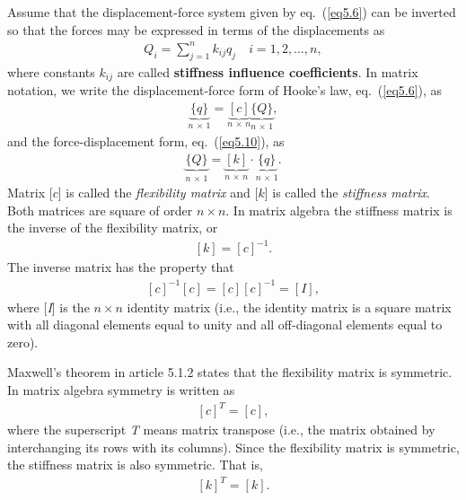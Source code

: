 \documentclass{AeroStructure-ERJohnson}
\begin{document}
Assume that the displacement-force system given by eq.~(\ref{eq5.6}) can be inverted so that the forces may be expressed in terms of the displacements as
\begin{align}\label{eq5.10}
 Q_{i}=\sum_{j=1}^{n} k_{i j} q_{j} \quad i=1,2, \ldots, n ,
\end{align}
where constants $ k_{i j} $ are called \textbf{stiffness influence coefficients}. In matrix notation, we write the displacement-force form of Hooke's law, eq.~(\ref{eq5.6}), as
\begin{align}\label{eq5.11}
 \underbrace{\{q\}}_{n\, \times\, 1}=\underbrace{[c]}_{n\, \times\, n} \underbrace{\{Q\}}_{n\, \times\, 1} ,
\end{align}
and the force-displacement form, eq.~(\ref{eq5.10}), as
\begin{align}\label{eq5.12}
\underbrace{\{Q\}}_{n\, \times\, 1}=\underbrace{[k]}_{n \,\times \,n} \cdot \underbrace{\{q\}}_{n \,\times \,1} .
\end{align}
Matrix [$c$] is called the \textit{flexibility matrix} and [$k$] is called the \textit{stiffness matrix}. Both matrices are square of order $ n \times n $. In matrix algebra the stiffness matrix is the inverse of the flexibility matrix, or
\begin{align}\label{eq5.13}
[k]=[c]^{-1} .
\end{align}
The inverse matrix has the property that
\begin{align}\label{eq5.14}
[c]^{-1}[c]=[c][c]^{-1}=[I] ,
\end{align}
where [\textit{I}] is the $ n \times n $ identity matrix (i.e., the identity matrix is a square matrix with all diagonal elements equal to unity and all off-diagonal elements equal to zero).

Maxwell's theorem in article 5.1.2 states that the flexibility matrix is symmetric. In matrix algebra symmetry is written as
\begin{align}\label{eq5.15}
 [c]^{T}=[c] ,
\end{align}
where the superscript \textit{T} means matrix transpose (i.e., the matrix obtained by interchanging its rows with its columns). Since the flexibility matrix is symmetric, the stiffness matrix is also symmetric. That is,
\begin{align}\label{eq5.16}
 [k]^{T}=[k].
\end{align}
\end{document}
